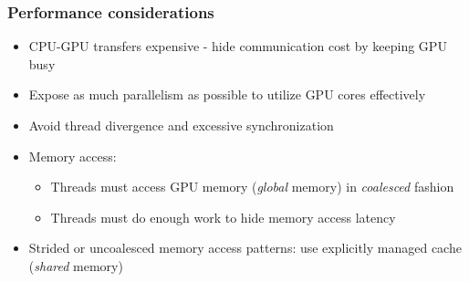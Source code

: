 \begin{frame}
\frametitle{Performance considerations}
\begin{itemize}
\item CPU-GPU transfers expensive -
    hide communication cost by keeping GPU busy
\item Expose as much parallelism as possible
    to utilize GPU cores effectively
\item Avoid thread divergence and excessive
    synchronization
\item Memory access:
    \begin{itemize}
        \item Threads must access GPU memory (\emph{global} memory) in \emph{coalesced}
            fashion
        \item Threads must do enough work to hide
            memory access latency
    \end{itemize}
\item Strided or uncoalesced memory access patterns:
    use explicitly managed cache (\emph{shared} memory)
\end{itemize}
\end{frame}

